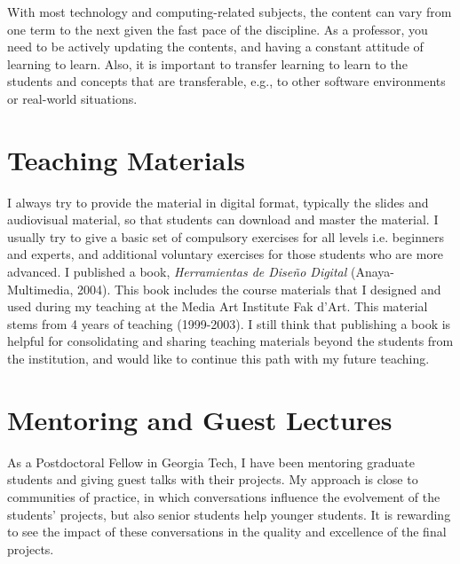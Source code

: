 \documentclass[10pt, a4paper]{article}
\begin{document}
With most technology and computing-related subjects, the content can vary from one term to the next given the fast pace of the discipline. As a professor, you need to be actively updating the contents, and having a constant attitude of learning to learn. Also, it is important to transfer learning to learn to the students and concepts that are transferable, e.g., to other software environments or real-world situations.

\section*{Teaching Materials}

I always try to provide the material in digital format, typically the slides and audiovisual material, so that students can download and master the material. I usually try to give a basic set of compulsory exercises for all levels i.e. beginners and experts, and additional voluntary exercises for those students who are more advanced. I published a book, \emph{Herramientas de Diseño Digital} (Anaya-Multimedia, 2004). This book includes the course materials that I designed and used during my teaching at the Media Art Institute Fak d'Art. This material stems from 4 years of teaching (1999-2003). I still think that publishing a book is helpful for consolidating and sharing teaching materials beyond the students from the institution, and would like to continue this path with my future teaching.

\section*{Mentoring and Guest Lectures}

As a Postdoctoral Fellow in Georgia Tech, I have been mentoring graduate students and giving guest talks with their projects. My approach is close to communities of practice, in which conversations influence the evolvement of the students' projects, but also senior students help younger students. It is rewarding to see the impact of these conversations in the quality and excellence of the final projects.
\end{document}
